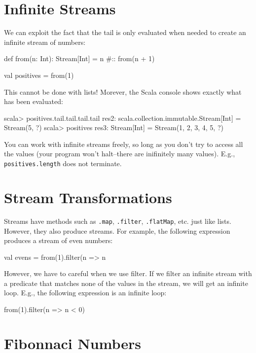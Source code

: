 \documentclass[9pt]{extbook}
\begin{document}
\section{Infinite Streams}

We can exploit the fact that the tail is only evaluated when needed to create
an infinite stream of numbers:

\begin{scalacode}
def from(n: Int): Stream[Int] = n #:: from(n + 1)

val positives = from(1)
\end{scalacode}

This cannot be done with lists! Morever, the Scala console shows exactly what has
been evaluated:

\begin{console}
scala> positives.tail.tail.tail.tail
res2: scala.collection.immutable.Stream[Int] = Stream(5, ?)
scala> positives
res3: Stream[Int] = Stream(1, 2, 3, 4, 5, ?)
\end{console}

You can work with infinite streams freely, so long as you don't try to access
all the values (your program won't halt--there are inifinitely many values).
E.g., \lstinline|positives.length| does not terminate.


\section{Stream Transformations}

Streams have methods such as \lstinline|.map|, \lstinline|.filter|, \lstinline|.flatMap|, etc.
just like lists. However, they also produce streams. For example, the following expression
produces a stream of even numbers:

\begin{scalacode}
val evens = from(1).filter(n => n %
\end{scalacode}

However, we have to careful when we use filter. If we filter an infinite stream with a
predicate that matches none of the values in the stream, we will get an infinite loop.
E.g., the following expression is an infinite loop:

\begin{scalacode}
  from(1).filter(n => n < 0)
\end{scalacode}

\section{Fibonnaci Numbers}
\end{document}
